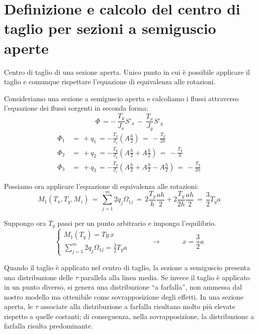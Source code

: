 \section{Definizione e calcolo del centro di taglio per sezioni a semiguscio aperte}

\begin{definizioneBox}
    Centro di taglio di una sezione aperta. Unico punto in cui è possibile applicare il taglio e comunque rispettare l'equazione di equivalenza alle rotazioni.
\end{definizioneBox}

Consideriamo una sezione a semiguscio aperta e calcoliamo i flussi attraverso l'equazione dei flussi sorgenti in seconda forma:
\begin{equation*}
       \Phi\, = -\, \frac{T_y}{J_x}S'_x  \,-\, \frac{T_x}{J_y}S'_y 
    \end{equation*}
    \begin{align*}
        \Phi_1 \,&=\, +q_1 \,=  -\frac{T_y}{J_x}\left( A\frac{h}{2} \right) \,=\, -\frac{T_y}{2h}\\
         \Phi_2 \,&=\, +q_2 \,=  -\frac{T_y}{J_x}\left( A\frac{h}{2}+A\frac{h}{2} \right) \,=\, -\frac{T_y}{h}\\
          \Phi_3 \,&=\, +q_3 \,=  -\frac{T_y}{J_x}\left( A\frac{h}{2}+A\frac{h}{2}-A\frac{h}{2} \right) \,=\, -\frac{T_y}{2h}
    \end{align*}


Possiamo ora applicare l'equazione di equivalenza alle rotazioni:
\begin{equation*}
    M_1 (T_x, T_y, M_z)\,=\, \sum^m_{j=1}2q_j\Omega_{1j} \,=\, 2\frac{T_y}{h} \frac{ah}{2} +2\frac{T_y}{2h} \frac{ah}{2} \,=\, \frac{3}{2}T_ya
\end{equation*}

Suppongo ora $T_y$ passi per un punto arbitrario e impongo l'equilibrio.
\begin{equation*}
\begin{cases}
     M_1(T_y)=Ty\,x\\
    \sum^m_{j=1}2q_j\Omega_{1j} = \frac{3}{2}T_ya
\end{cases}
\quad\quad\quad\rightarrow\quad\quad\quad
   x=\frac{3}{2}a
\end{equation*}



Quando il taglio è applicato nel centro di taglio, la sezione a semiguscio presenta una distribuzione delle $\tau$ parallela alla linea media. Se invece il taglio è applicato in un punto diverso, si genera una distribuzione “a farfalla”, non ammessa dal nostro modello ma ottenibile come sovrapposizione degli effetti. In una sezione aperta, le $\tau$ associate alla distribuzione a farfalla risultano molto più elevate rispetto a quelle costanti; di conseguenza, nella sovrapposizione, la distribuzione a farfalla risulta predominante.










